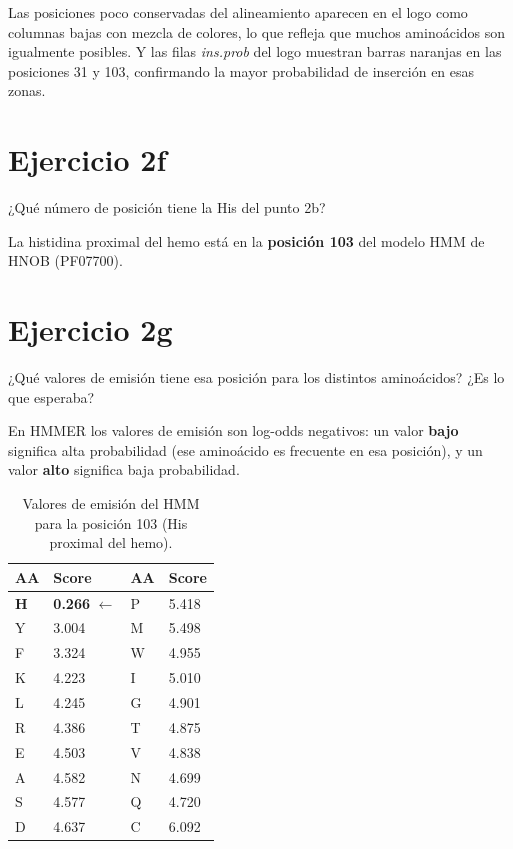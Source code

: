 Las posiciones poco conservadas del alineamiento aparecen en el logo como columnas bajas con
mezcla de colores, lo que refleja que muchos aminoácidos son igualmente posibles. Y las filas
\textit{ins.prob} del logo muestran barras naranjas en las posiciones 31 y 103, confirmando
la mayor probabilidad de inserción en esas zonas.

\section{Ejercicio 2f}

\begin{consigna}
¿Qué número de posición tiene la His del punto 2b?
\end{consigna}

La histidina proximal del hemo está en la \textbf{posición 103} del modelo HMM de HNOB (PF07700).

\section{Ejercicio 2g}

\begin{consigna}
¿Qué valores de emisión tiene esa posición para los distintos aminoácidos? ¿Es lo que esperaba?
\end{consigna}

En HMMER los valores de emisión son log-odds negativos: un valor \textbf{bajo} significa alta
probabilidad (ese aminoácido es frecuente en esa posición), y un valor \textbf{alto} significa
baja probabilidad.

\begin{table}[H]
\centering
\footnotesize
\begin{tabular}{P{1.5cm}P{2cm}P{1.5cm}P{2cm}}
\toprule
AA & Score & AA & Score \\
\midrule
\textbf{H} & \textbf{0.266} $\leftarrow$ & P & 5.418 \\
Y & 3.004 & M & 5.498 \\
F & 3.324 & W & 4.955 \\
K & 4.223 & I & 5.010 \\
L & 4.245 & G & 4.901 \\
R & 4.386 & T & 4.875 \\
E & 4.503 & V & 4.838 \\
A & 4.582 & N & 4.699 \\
S & 4.577 & Q & 4.720 \\
D & 4.637 & C & 6.092 \\
\bottomrule
\end{tabular}
\caption{Valores de emisión del HMM para la posición 103 (His proximal del hemo).}
\end{table}

